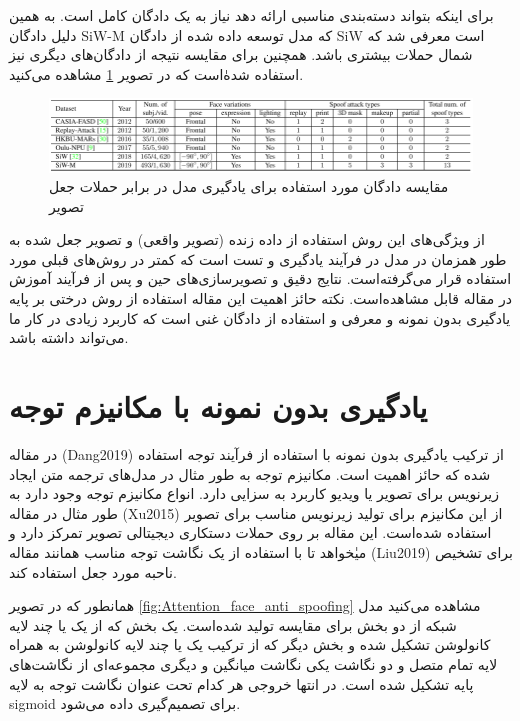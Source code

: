 برای اینکه بتواند دسته‌بندی مناسبی ارائه دهد نیاز به یک دادگان کامل است. به همین دلیل دادگان SiW-M که مدل توسعه داده شده از دادگان SiW است معرفی شد که شمال حملات بیشتری باشد. همچنین برای مقایسه نتیجه از دادگان‌های دیگری نیز استفاده شده‌ٰاست که در تصویر
\ref{fig:Deep_tree_dataset} 
مشاهده می‌کنید.
\begin{figure}[h]
	\centering
	\includegraphics[width=1\textwidth]{img/report/Deep_tree_dataset}
	\caption{مقایسه دادگان مورد استفاده برای یادگیری مدل در برابر حملات جعل تصویر\cite{Liu2019}}
	\label{fig:Deep_tree_dataset}
	\centering
\end{figure} 

از ویژگی‌های این روش استفاده از داده زنده (تصویر واقعی) و تصویر جعل شده به طور همزمان در مدل در فرآیند یادگیری و تست است که کمتر در روش‌های قبلی مورد استفاده قرار می‌گرفته‌است. نتایج دقیق و تصویر‌سازی‌های حین و پس از فرآیند آموزش در مقاله قابل مشاهده‌است. نکته حائز اهمیت این مقاله استفاده از روش درختی‌ بر پایه یادگیری بدون نمونه و معرفی و استفاده از دادگان غنی است که کاربرد زیادی در کار ما می‌تواند داشته باشد.

\section{یادگیری بدون نمونه با مکانیزم توجه}
در مقاله (Dang2019) 
\cite{Dang2019} 
از ترکیب یادگیری بدون نمونه با استفاده از فرآیند توجه استفاده شده‌ که حائز اهمیت است. مکانیزم توجه به طور مثال در مدل‌های ترجمه متن ایجاد زیرنویس برای تصویر یا ویدیو کاربرد به سزایی دارد. انواع مکانیزم توجه وجود دارد به طور مثال در مقاله (Xu2015) 
\cite{Xu2015}
 از این مکانیزم برای تولید زیرنویس مناسب برای تصویر استفاده شده‌است. این مقاله بر روی حملات دستکاری دیجیتالی  تصویر تمرکز دارد و میٰخواهد تا با استفاده از یک نگاشت توجه مناسب همانند مقاله (Liu2019)
 \cite{Liu2019} 
 برای تشخیص ناحبه مورد جعل استفاده کند.
 
 همانطور که در تصویر 
 \ref{fig:Attention_face_anti_spoofing} 
 مشاهده می‌کنید مدل شبکه از دو بخش برای مقایسه تولید شده‌است. یک بخش که از یک یا چند لایه کانولوشن تشکیل شده و بخش دیگر که از ترکیب یک یا چند لایه کانولوشن به همراه لایه تمام متصل و دو نگاشت یکی نگاشت میانگین و دیگری مجموعه‌ای از نگاشت‌های پایه تشکیل شده است. در انتها خروجی هر کدام تحت عنوان نگاشت توجه به لایه sigmoid برای تصمیم‌گیری داده می‌شود.

